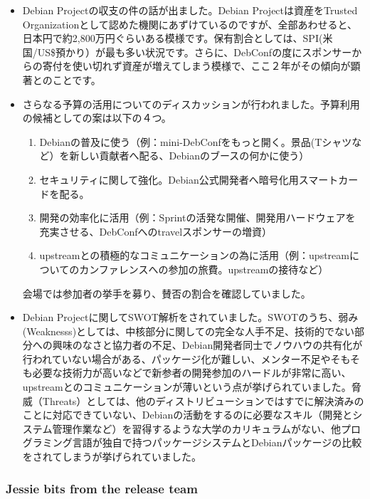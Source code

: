 \documentclass[mingoth,a4paper]{jsarticle}
\begin{document}
 \begin{itemize}
 \item Debian Projectの収支の件の話が出ました。Debian Projectは資産をTrusted Organizationとして認めた機関にあずけているのですが、全部あわせると、日本円で約2,800万円ぐらいある模様です。保有割合としては、SPI(米国/US\$預かり）が最も多い状況です。さらに、DebConfの度にスポンサーからの寄付を使い切れず資産が増えてしまう模様で、ここ２年がその傾向が顕著とのことです。
 \item さらなる予算の活用についてのディスカッションが行われました。予算利用の候補としての案は以下の４つ。
   \begin{enumerate}
      \item Debianの普及に使う（例：mini-DebConfをもっと開く。景品(Tシャツなど）を新しい貢献者へ配る、Debianのブースの何かに使う）
      \item セキュリティに関して強化。Debian公式開発者へ暗号化用スマートカードを配る。
      \item 開発の効率化に活用（例：Sprintの活発な開催、開発用ハードウェアを充実させる、DebConfへのtravelスポンサーの増資）
      \item upstreamとの積極的なコミュニケーションの為に活用（例：upstreamについてのカンファレンスへの参加の旅費。upstreamの接待など）
   \end{enumerate}
   会場では参加者の挙手を募り、賛否の割合を確認していました。
 \end{itemize}

 \begin{itemize}
 \item Debian Projectに関してSWOT解析をされていました。SWOTのうち、弱み(Weaknesss)としては、中核部分に関しての完全な人手不足、技術的でない部分への興味のなさと協力者の不足、Debian開発者同士でノウハウの共有化が行われていない場合がある、パッケージ化が難しい、メンター不足やそもそも必要な技術力が高いなどで新参者の開発参加のハードルが非常に高い、upstreamとのコミュニケーションが薄いという点が挙げられていました。脅威（Threats）としては、他のディストリビューションではすでに解決済みのことに対応できていない、Debianの活動をするのに必要なスキル（開発とシステム管理作業など）を習得するような大学のカリキュラムがない、他プログラミング言語が独自で持つパッケージシステムとDebianパッケージの比較をされてしまうが挙げられていました。
\end{itemize}

\subsubsection{Jessie bits from the release team}
\end{document}

